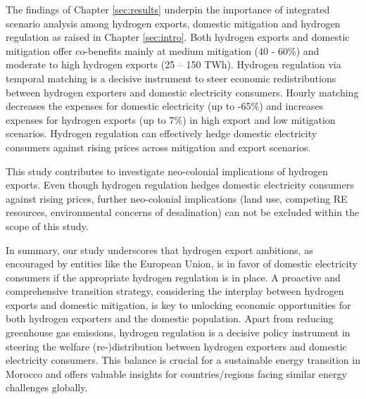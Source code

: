 




The findings of Chapter \ref{sec:results} underpin the importance of integrated scenario analysis among hydrogen exports, domestic mitigation and hydrogen regulation as raised in Chapter \ref{sec:intro}.
Both hydrogen exports and domestic mitigation offer co-benefits mainly at medium mitigation (40 - 60\%) and moderate to high hydrogen exports (25 – 150 TWh). Hydrogen regulation via temporal matching is a decisive instrument to steer economic redistributions between hydrogen exporters and domestic electricity consumers. Hourly matching decreases the expenses for domestic electricity (up to -65\%) and increases expenses for hydrogen exports (up to 7\%) in high export and low mitigation scenarios. Hydrogen regulation can effectively hedge domestic electricity consumers against rising prices across mitigation and export scenarios. %

This study contributes to investigate neo-colonial implications of hydrogen exports. Even though hydrogen regulation hedges domestic electricity consumers against rising prices, further neo-colonial implications (land use, competing RE resources, environmental concerns of desalination) can not be excluded within the scope of this study.


In summary, our study underscores that hydrogen export ambitions, as encouraged by entities like the European Union, is in favor of domestic electricity consumers 
if the appropriate hydrogen regulation is in place. A proactive and comprehensive transition strategy, considering the interplay between hydrogen exports and domestic mitigation, is key to unlocking economic opportunities for both hydrogen exporters and the domestic population. 
Apart from reducing greenhouse gas emissions, hydrogen regulation is a decisive policy instrument in steering the welfare (re-)distribution between hydrogen exporters and domestic electricity consumers. 
This balance is crucial for a sustainable energy transition in Morocco and offers valuable insights for countries/regions facing similar energy challenges globally.




